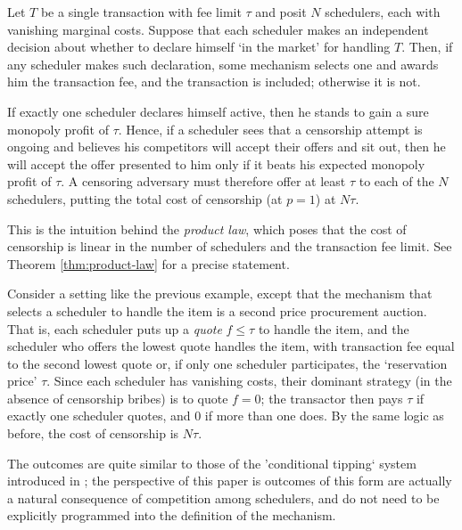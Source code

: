 \begin{example}

  Let $T$ be a single transaction with fee limit $\tau$ and posit $N$ schedulers, each with vanishing marginal costs.
  Suppose that each scheduler makes an independent decision about whether to declare himself `in the market' for handling $T$.
  Then, if any scheduler makes such declaration, some mechanism selects one and awards him the transaction fee, and the transaction is included; otherwise it is not.

  If exactly one scheduler declares himself active, then he stands to gain a sure monopoly profit of $\tau$.
  Hence, if a scheduler sees that a censorship attempt is ongoing and believes his competitors will accept their offers and sit out, then he will accept the offer presented to him only if it beats his expected monopoly profit of $\tau$.
  A censoring adversary must therefore offer at least $\tau$ to each of the $N$ schedulers, putting the total cost of censorship (at $p=1$) at $N\tau$.
  
  This is the intuition behind the \emph{product law}, which poses that the cost of censorship is linear in the number of schedulers and the transaction fee limit.
  See Theorem \ref{thm:product-law} for a precise statement.

\end{example}

\begin{example}

  Consider a setting like the previous example, except that the mechanism that selects a scheduler to handle the item is a second price procurement auction.
  That is, each scheduler puts up a \emph{quote} $f\leq \tau$ to handle the item, and the scheduler who offers the lowest quote handles the item, with transaction fee equal to the second lowest quote or, if only one scheduler participates, the `reservation price' $\tau$.
  Since each scheduler has vanishing costs, their dominant strategy (in the absence of censorship bribes) is to quote $f=0$; the transactor then pays $\tau$ if exactly one scheduler quotes, and $0$ if more than one does.
  By the same logic as before, the cost of censorship is $N\tau$.
  
  The outcomes are quite similar to those of the 'conditional tipping` system introduced in \cite{FPR}; the perspective of this paper is outcomes of this form are actually a natural consequence of competition among schedulers, and do not need to be explicitly programmed into the definition of the mechanism.

\end{example}

